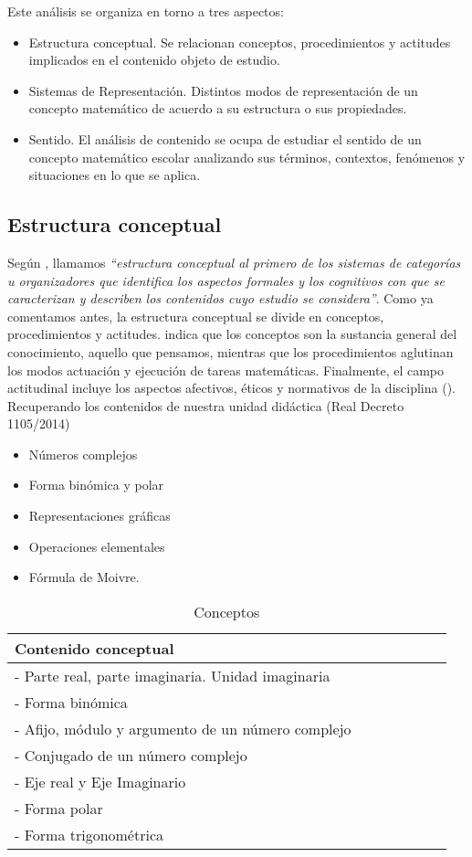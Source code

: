 \documentclass[../main.tex]{memoir}
\begin{document}
Este análisis se organiza en torno a tres aspectos:

\begin{itemize}
	\item Estructura conceptual. Se relacionan conceptos, procedimientos y actitudes implicados en el contenido objeto de estudio.
	\item Sistemas de Representación. Distintos modos de representación de un concepto matemático de acuerdo a su estructura o sus propiedades.
	\item Sentido. El análisis de contenido se ocupa de estudiar el sentido de un concepto matemático escolar analizando sus términos, contextos, fenómenos y situaciones en lo que se aplica.
\end{itemize}


\subsection{Estructura conceptual}

Según \cite{rico2016}, llamamos \textit{``estructura conceptual al primero de los sistemas de categorías u organizadores que identifica los aspectos formales y los cognitivos con que se caracterizan y describen los contenidos cuyo estudio se considera''}. Como ya comentamos antes, la estructura conceptual se divide en conceptos, procedimientos y actitudes. \cite{rico1997} indica que los conceptos son la sustancia general del conocimiento, aquello que pensamos, mientras que los procedimientos aglutinan los modos actuación y ejecución de tareas matemáticas. Finalmente, el campo actitudinal incluye los aspectos afectivos, éticos y normativos de la disciplina (\cite{rico2016}). Recuperando los contenidos de nuestra unidad didáctica (Real Decreto 1105/2014)

\begin{itemize}
	\item Números complejos
	\item Forma binómica y polar
	\item Representaciones gráficas
	\item Operaciones elementales
	\item Fórmula de Moivre.
\end{itemize}

\begin{table}[H]
	\centering
	\begin{tabular}{lcccccc}
		\toprule
		\hspace{2.5cm}Contenido conceptual \\
		\midrule
		- Parte real, parte imaginaria. Unidad imaginaria \\
		- Forma binómica \\
		- Afijo, módulo y argumento de un número complejo \\
		- Conjugado de un número complejo \\
		- Eje real y Eje Imaginario \\
		- Forma polar \\
		- Forma trigonométrica\\
		\bottomrule
	\end{tabular}
	\caption{Conceptos}
	\label{tab:conceptos}
\end{table}
\end{document}
